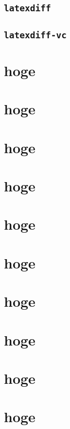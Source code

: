 \documentclass[
    paper=a4paper,      %
    report,             %
    fleqn,              %
    fontsize=12pt,      %
    jafontsize=12pt,    %
    head_space=33mm,    %
    foot_space=30mm,    %
    gutter=25mm,        %
    fore-edge=10mm      %
    ]{jlreq}            %
\begin{document}
\lipsum[1-10]

\section{\texttt{latexdiff}}
\label{sec:latexdiff}

\lipsum[1-8]


\section{\texttt{latexdiff-vc}}
\label{sec:latexdiff-vc}

\chapter{hoge}

\chapter{hoge}

\chapter{hoge}

\chapter{hoge}

\chapter{hoge}

\chapter{hoge}

\chapter{hoge}

\chapter{hoge}

\chapter{hoge}

\chapter{hoge}
\end{document}
